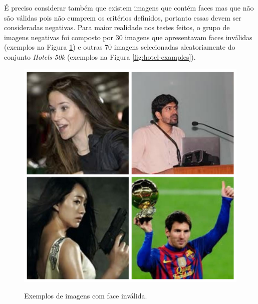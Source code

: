 É preciso considerar também que existem imagens que contém faces mas que não são válidas pois não cumprem os critérios definidos, portanto essas devem ser consideradas negativas. Para maior realidade nos testes feitos, o grupo de imagens negativas foi composto por 30 imagens que apresentavam faces inválidas (exemplos na Figura \ref{fig:invalid-faces}) e outras 70 imagens selecionadas aleatoriamente do conjunto \textit{Hotels-50k} (exemplos na Figura \ref{fig:hotel-examples}).

\begin{figure}[htbp]
    \centering
    \caption{Exemplos de imagens com face inválida.}
    \includegraphics[scale=.25]{figs/invalid_faces.jpg}
    \label{fig:invalid-faces}
\end{figure}

